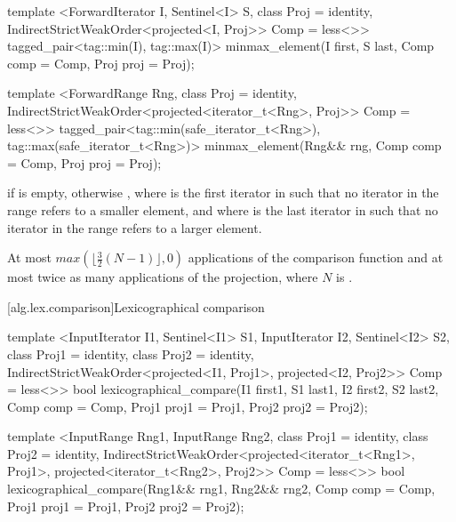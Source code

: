 %
\begin{itemdecl}
template <ForwardIterator I, Sentinel<I> S, class Proj = identity,
    IndirectStrictWeakOrder<projected<I, Proj>> Comp = less<>>
  tagged_pair<tag::min(I), tag::max(I)>
    minmax_element(I first, S last, Comp comp = Comp{}, Proj proj = Proj{});

template <ForwardRange Rng, class Proj = identity,
    IndirectStrictWeakOrder<projected<iterator_t<Rng>, Proj>> Comp = less<>>
  tagged_pair<tag::min(safe_iterator_t<Rng>),
              tag::max(safe_iterator_t<Rng>)>
    minmax_element(Rng&& rng, Comp comp = Comp{}, Proj proj = Proj{});
\end{itemdecl}

\begin{itemdescr}
\pnum
\returns
{} if  is empty, otherwise
, where  is
the first iterator in  such that no iterator in the range refers to a smaller
element, and where  is the last iterator in  such that no iterator
in the range refers to a larger element.

\pnum
\complexity
At most
$max(\lfloor{\frac{3}{2}} (N-1)\rfloor, 0)$
applications of the comparison function and
at most twice as many applications of the projection,
where $N$ is .
\end{itemdescr}

[alg.lex.comparison]{Lexicographical comparison}

%
\begin{itemdecl}
template <InputIterator I1, Sentinel<I1> S1, InputIterator I2, Sentinel<I2> S2,
    class Proj1 = identity, class Proj2 = identity,
    IndirectStrictWeakOrder<projected<I1, Proj1>, projected<I2, Proj2>> Comp = less<>>
  bool
    lexicographical_compare(I1 first1, S1 last1, I2 first2, S2 last2,
                            Comp comp = Comp{}, Proj1 proj1 = Proj1{}, Proj2 proj2 = Proj2{});

template <InputRange Rng1, InputRange Rng2, class Proj1 = identity,
    class Proj2 = identity,
    IndirectStrictWeakOrder<projected<iterator_t<Rng1>, Proj1>,
      projected<iterator_t<Rng2>, Proj2>> Comp = less<>>
  bool
    lexicographical_compare(Rng1&& rng1, Rng2&& rng2, Comp comp = Comp{},
                            Proj1 proj1 = Proj1{}, Proj2 proj2 = Proj2{});
\end{itemdecl}

